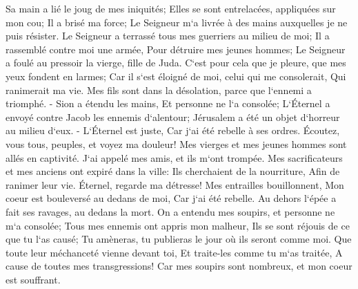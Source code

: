 \verse Sa main a lié le joug de mes iniquités; Elles se sont entrelacées, appliquées sur mon cou; Il a brisé ma force; Le Seigneur m`a livrée à des mains auxquelles je ne puis résister. 
\verse Le Seigneur a terrassé tous mes guerriers au milieu de moi; Il a rassemblé contre moi une armée, Pour détruire mes jeunes hommes; Le Seigneur a foulé au pressoir la vierge, fille de Juda. 
\verse C`est pour cela que je pleure, que mes yeux fondent en larmes; Car il s`est éloigné de moi, celui qui me consolerait, Qui ranimerait ma vie. Mes fils sont dans la désolation, parce que l`ennemi a triomphé. - 
\verse Sion a étendu les mains, Et personne ne l`a consolée; L`Éternel a envoyé contre Jacob les ennemis d`alentour; Jérusalem a été un objet d`horreur au milieu d`eux. - 
\verse L`Éternel est juste, Car j`ai été rebelle à ses ordres. Écoutez, vous tous, peuples, et voyez ma douleur! Mes vierges et mes jeunes hommes sont allés en captivité. 
\verse J`ai appelé mes amis, et ils m`ont trompée. Mes sacrificateurs et mes anciens ont expiré dans la ville: Ils cherchaient de la nourriture, Afin de ranimer leur vie. 
\verse Éternel, regarde ma détresse! Mes entrailles bouillonnent, Mon coeur est bouleversé au dedans de moi, Car j`ai été rebelle. Au dehors l`épée a fait ses ravages, au dedans la mort. 
\verse On a entendu mes soupirs, et personne ne m`a consolée; Tous mes ennemis ont appris mon malheur, Ils se sont réjouis de ce que tu l`as causé; Tu amèneras, tu publieras le jour où ils seront comme moi. 
\verse Que toute leur méchanceté vienne devant toi, Et traite-les comme tu m`as traitée, A cause de toutes mes transgressions! Car mes soupirs sont nombreux, et mon coeur est souffrant. 

